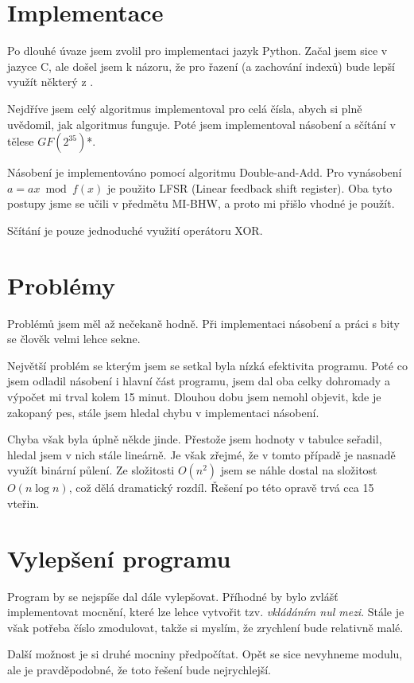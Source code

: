 \documentclass[czech,a4paper,11pt]{article}
\begin{document}
\section{Implementace}

Po dlouhé úvaze jsem zvolil pro implementaci jazyk Python. Začal jsem sice v jazyce C, ale došel jsem k názoru, že pro řazení (a zachování indexů) bude lepší využít některý z .

Nejdříve jsem celý algoritmus implementoval pro celá čísla, abych si plně uvědomil, jak algoritmus funguje. Poté jsem implementoval násobení a sčítání v tělese $GF(2^{35})$\mbox{*}.

Násobení je implementováno pomocí algoritmu Double-and-Add. Pro vynásobení $a=ax \bmod {f(x)}$ je použito LFSR (Linear feedback shift register). Oba tyto postupy jsme se učili v předmětu MI-BHW, a proto mi přišlo vhodné je použít.

Sčítání je pouze jednoduché využití operátoru XOR.

\section{Problémy}
Problémů jsem měl až nečekaně hodně. Při implementaci násobení a práci s bity se člověk velmi lehce sekne.

Největší problém se kterým jsem se setkal byla nízká efektivita programu. Poté co jsem odladil násobení i hlavní část programu, jsem dal oba celky dohromady a výpočet mi trval kolem 15 minut. Dlouhou dobu jsem nemohl objevit, kde je zakopaný pes, stále jsem hledal chybu v implementaci násobení.

Chyba však byla úplně někde jinde. Přestože jsem hodnoty v tabulce seřadil, hledal jsem v nich stále lineárně. Je však zřejmé, že v tomto případě je nasnadě využít binární půlení. Ze složitosti $O(n^2)$ jsem se náhle dostal na složitost $O(n\log{}n)$, což dělá dramatický rozdíl. Řešení po této opravě trvá cca 15 vteřin.

\section{Vylepšení programu}

Program by se nejspíše dal dále vylepšovat. Příhodné by bylo zvlášť implementovat mocnění, které lze lehce vytvořit tzv. \emph{vkládáním nul mezi}. Stále je však potřeba číslo zmodulovat, takže si myslím, že zrychlení bude relativně malé. 

Další možnost je si druhé mocniny předpočítat. Opět se sice nevyhneme modulu, ale je pravděpodobné, že toto řešení bude nejrychlejší.
\end{document}
